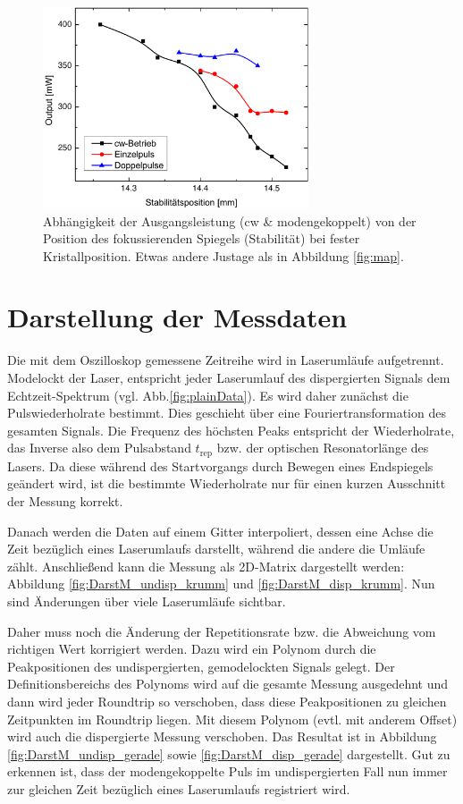 \documentclass[bachelor,       %
               twoside,        %
               BCOR10mm,       %
               liststotoc,nomtotoc,bibtotoc, %
               english,ngerman, %
               final,          %
               ]{GAUBM}
\begin{document}
\begin{figure}[!htb]
	\centering
	\includegraphics[width=0.7\textwidth]{figures/map2.pdf}
	\caption{Abhängigkeit der Ausgangsleistung (cw \& modengekoppelt) von der Position des fokussierenden Spiegels (Stabilität) bei fester Kristallposition.
	Etwas andere Justage als in Abbildung \ref{fig:map}.}
	\label{fig:map2}
\end{figure}


\section{Darstellung der Messdaten}
Die mit dem Oszilloskop  gemessene Zeitreihe wird in Laserumläufe aufgetrennt.
Modelockt der Laser, entspricht jeder Laserumlauf des dispergierten Signals dem Echtzeit-Spektrum (vgl. Abb.\ref{fig:plainData}).
Es wird daher zunächst die Pulswiederholrate bestimmt.
Dies geschieht über eine Fouriertransformation des gesamten Signals.
Die Frequenz des höchsten Peaks entspricht der Wiederholrate, das Inverse also dem Pulsabstand $t_\text{rep}$ bzw. der optischen Resonatorlänge des Lasers.
Da diese während des Startvorgangs durch Bewegen eines Endspiegels geändert wird, ist die bestimmte Wiederholrate nur für einen kurzen Ausschnitt der Messung korrekt.

Danach werden die Daten auf einem Gitter interpoliert, dessen eine Achse die Zeit bezüglich eines Laserumlaufs darstellt, während die andere die Umläufe zählt.
Anschließend kann die Messung als 2D-Matrix dargestellt werden: Abbildung \ref{fig:DarstM_undisp_krumm} und \ref{fig:DarstM_disp_krumm}.
Nun sind Änderungen über viele Laserumläufe sichtbar.


Daher muss noch die Änderung der Repetitionsrate bzw. die Abweichung vom richtigen Wert korrigiert werden.
Dazu wird ein Polynom durch die Peakpositionen des undispergierten, gemodelockten Signals gelegt. Der Definitionsbereichs des Polynoms wird auf die gesamte Messung ausgedehnt und dann wird jeder Roundtrip so verschoben, dass diese Peakpositionen zu gleichen Zeitpunkten im Roundtrip liegen.
Mit diesem Polynom (evtl. mit anderem Offset) wird auch die dispergierte Messung verschoben.
Das Resultat ist in Abbildung \ref{fig:DarstM_undisp_gerade} sowie \ref{fig:DarstM_disp_gerade} dargestellt.
Gut zu erkennen ist, dass der modengekoppelte Puls im undispergierten Fall nun immer zur gleichen Zeit bezüglich eines Laserumlaufs registriert wird.
\end{document}
